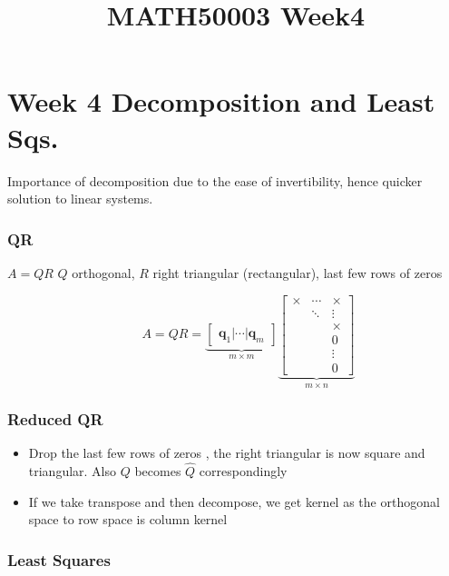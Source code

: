 \documentclass[
]{article}
\title{MATH50003 Week4}
\author{}
\date{\vspace{-2.5em}}
\begin{document}
\maketitle

\hypertarget{week-4-decomposition-and-least-sqs.}{%
\section{\texorpdfstring{\textbf{Week 4 Decomposition and Least
Sqs.}}{Week 4 Decomposition and Least Sqs.}}\label{week-4-decomposition-and-least-sqs.}}

Importance of decomposition due to the ease of invertibility, hence
quicker solution to linear systems.

\hypertarget{qr}{%
\subsubsection{\texorpdfstring{\textbf{QR}}{QR}}\label{qr}}

\(A=QR\) \(Q\) orthogonal, \(R\) right triangular (rectangular), last
few rows of zeros

\[  
\qquad A = Q R = \underbrace{\begin{bmatrix} 𝐪_1 | \cdots | 𝐪_m \end{bmatrix}}_{m × m}
\underbrace{\begin{bmatrix} × & \cdots & × \\ 
& ⋱ & ⋮ \\ 
&& × \\ 
&&0 \\ 
&&⋮ \\ 
&& 0 
\end{bmatrix}}_{m × n}
\]

\hypertarget{reduced-qr}{%
\subsubsection{\texorpdfstring{\textbf{Reduced
QR}}{Reduced QR}}\label{reduced-qr}}

\begin{itemize}
\item
  Drop the last few rows of zeros , the right triangular is now square
  and triangular. Also \(Q\) becomes \(\hat{Q}\) correspondingly
\item
  If we take transpose and then decompose, we get kernel as the
  orthogonal space to row space is column kernel
\end{itemize}

\hypertarget{least-squares}{%
\subsubsection{\texorpdfstring{\textbf{Least
Squares}}{Least Squares}}\label{least-squares}}
\end{document}
